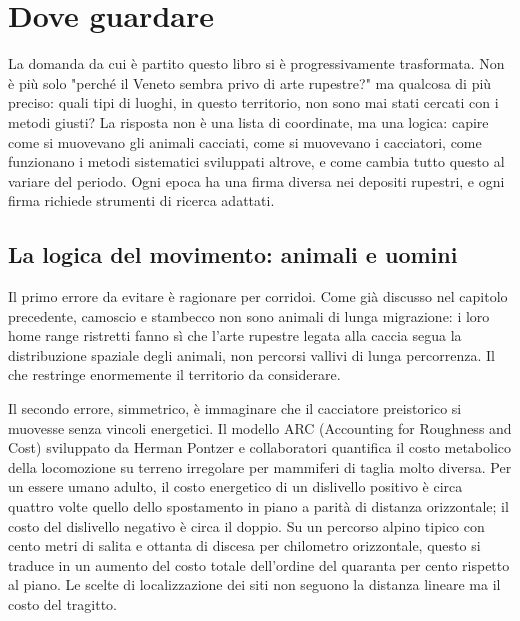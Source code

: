 \chapter{Dove guardare}
\label{cap:dove_guardare}

La domanda da cui è partito questo libro si è progressivamente trasformata. Non è più solo "perché il Veneto sembra privo di arte rupestre?" ma qualcosa di più preciso: quali tipi di luoghi, in questo territorio, non sono mai stati cercati con i metodi giusti? La risposta non è una lista di coordinate, ma una logica: capire come si muovevano gli animali cacciati, come si muovevano i cacciatori, come funzionano i metodi sistematici sviluppati altrove, e come cambia tutto questo al variare del periodo. Ogni epoca ha una firma diversa nei depositi rupestri, e ogni firma richiede strumenti di ricerca adattati.

\section{La logica del movimento: animali e uomini}

Il primo errore da evitare è ragionare per corridoi. Come già discusso nel capitolo precedente, camoscio e stambecco non sono animali di lunga migrazione: i loro home range ristretti fanno sì che l'arte rupestre legata alla caccia segua la distribuzione spaziale degli animali, non percorsi vallivi di lunga percorrenza. Il che restringe enormemente il territorio da considerare.

Il secondo errore, simmetrico, è immaginare che il cacciatore preistorico si muovesse senza vincoli energetici. Il modello ARC (Accounting for Roughness and Cost) sviluppato da Herman Pontzer e collaboratori \citep{pontzer2016} quantifica il costo metabolico della locomozione su terreno irregolare per mammiferi di taglia molto diversa. Per un essere umano adulto, il costo energetico di un dislivello positivo è circa quattro volte quello dello spostamento in piano a parità di distanza orizzontale; il costo del dislivello negativo è circa il doppio. Su un percorso alpino tipico con cento metri di salita e ottanta di discesa per chilometro orizzontale, questo si traduce in un aumento del costo totale dell'ordine del quaranta per cento rispetto al piano. Le scelte di localizzazione dei siti non seguono la distanza lineare ma il costo del tragitto.

